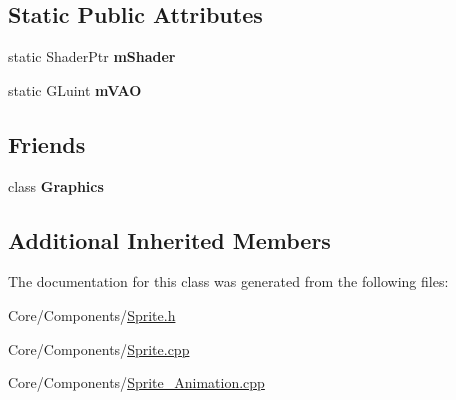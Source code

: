 \subsection*{Static Public Attributes}
\begin{DoxyCompactItemize}
\item 
\hypertarget{classDCEngine_1_1Components_1_1Sprite_a3920bfffa0aedc9f59bdf5140b4f614c}{static Shader\-Ptr {\bfseries m\-Shader}}\label{classDCEngine_1_1Components_1_1Sprite_a3920bfffa0aedc9f59bdf5140b4f614c}

\item 
\hypertarget{classDCEngine_1_1Components_1_1Sprite_aa64d289014a3e4d7cb7247c8b2839c18}{static G\-Luint {\bfseries m\-V\-A\-O}}\label{classDCEngine_1_1Components_1_1Sprite_aa64d289014a3e4d7cb7247c8b2839c18}

\end{DoxyCompactItemize}
\subsection*{Friends}
\begin{DoxyCompactItemize}
\item 
\hypertarget{classDCEngine_1_1Components_1_1Sprite_ae5cfe0c0e0b06d536d5814bd1ff4818f}{class {\bfseries Graphics}}\label{classDCEngine_1_1Components_1_1Sprite_ae5cfe0c0e0b06d536d5814bd1ff4818f}

\end{DoxyCompactItemize}
\subsection*{Additional Inherited Members}


The documentation for this class was generated from the following files\-:\begin{DoxyCompactItemize}
\item 
Core/\-Components/\hyperlink{Sprite_8h}{Sprite.\-h}\item 
Core/\-Components/\hyperlink{Sprite_8cpp}{Sprite.\-cpp}\item 
Core/\-Components/\hyperlink{Sprite__Animation_8cpp}{Sprite\-\_\-\-Animation.\-cpp}\end{DoxyCompactItemize}
